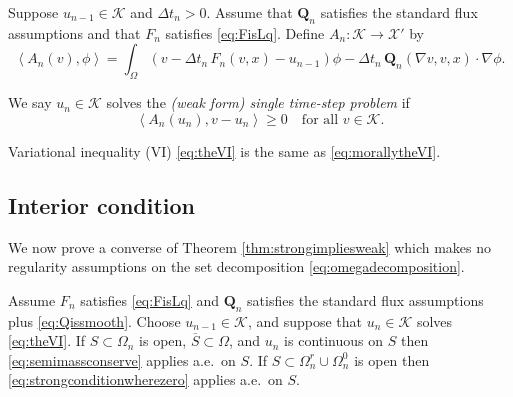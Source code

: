 \documentclass[final,onefignum]{siamart190516}
\newcommand\bQ{\mathbf{Q}}
\newcommand{\grad}{\nabla}
\newcommand{\ip}[2]{\ensuremath{\left<#1,#2\right>}}
\begin{document}
\begin{definition}  Suppose $u_{n-1}\in\mathcal{K}$ and $\Delta t_n>0$.  Assume that $\bQ_n$ satisfies the standard flux assumptions and that $F_n$ satisfies \eqref{eq:FisLq}.  Define $A_n:\mathcal{K} \to \mathcal{X}'$ by
\begin{equation}
  \ip{A_n(v)}{\phi} = \int_\Omega \left(v - \Delta t_n\, F_n(v,x) - u_{n-1}\right)\phi - \Delta t_n\, \bQ_n(\grad v,v,x) \cdot \grad\phi. \label{eq:defineAn}
\end{equation}
\end{definition}

\begin{definition}  We say $u_n\in\mathcal{K}$ solves the \emph{(weak form) single time-step problem} if
\begin{equation}
  \ip{A_n(u_n)}{v-u_n} \ge 0 \quad \text{for all } v \in \mathcal{K}.  \label{eq:theVI}
\end{equation}
\end{definition}

Variational inequality (VI) \eqref{eq:theVI} is the same as \eqref{eq:morallytheVI}.


\subsection{Interior condition}  \label{subsec:interior}  We now prove a converse of Theorem \ref{thm:strongimpliesweak} which makes no regularity assumptions on the set decomposition \eqref{eq:omegadecomposition}.

\begin{theorem} \label{thm:weakimpliesstrong}  Assume $F_n$ satisfies \eqref{eq:FisLq} and $\bQ_n$ satisfies the standard flux assumptions plus \eqref{eq:Qissmooth}.  Choose $u_{n-1}\in\mathcal{K}$, and suppose that $u_n\in\mathcal{K}$ solves \eqref{eq:theVI}.  If $S \subset \Omega_n$ is open, $\overline{S}\subset \Omega$, and $u_n$ is continuous on $S$ then \eqref{eq:semimassconserve} applies a.e.~on $S$.  If $S \subset \Omega_n^r \cup \Omega_n^0$ is open then \eqref{eq:strongconditionwherezero} applies a.e.~on $S$.
\end{theorem}
\end{document}
